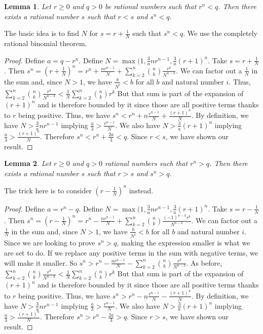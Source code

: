 \documentclass[12pt]{article}
\newtheorem{lemma}{Lemma}
\theoremstyle{remark}
\begin{document}
\begin{lemma}\label{app:lesser}
Let $r \geq 0 $ and $q > 0$ be rational numbers such that $r^n < q$. Then there exists a rational number $s$ such that $r < s$ and $s^n < q$.
\end{lemma}

The basic idea is to find $N$ for $s = r + \tfrac{1}{N}$ such that $s^n < q$. We use the completely rational binomial theorem.  

\begin{proof}
Define $a = q - r^n$. Define $N =  \max(1,\tfrac{3}{a}n r^{n-1}, \tfrac{3}{a}(r+1)^n$.  Take $s = r + \tfrac{1}{N}$. Then $s^n = (r+ \tfrac{1}{N})^n = r^n + \tfrac{n r^{n-1}}{N} + \sum_{k=2}^{n} \binom{n}{k} \tfrac{r^k}{N^{n-k}}$. We can factor out a $\tfrac{1}{N}$ in the sum and, since $N > 1$, we have $\tfrac{b}{N^i} < b$ for all $b$ and natural number $i$. Thus, $\sum_{k=2}^{n} \binom{n}{k} \tfrac{r^k}{N^{n-k}} < \tfrac{1}{N} \sum_{k=2}^{n} \binom{n}{k} r^k$  But that sum is part of the expansion of $(r+1)^n$ and is therefore bounded by it since those are all positive terms thanks to $r$ being positive. Thus, we have $s^n < r^n + n \tfrac{r^{n-1}}{N} + \tfrac{ (r+1)^n }{N}$.  By definition, we have $N > \tfrac{3}{a} n r^{n-1}$ implying $\tfrac{a}{3} > \tfrac{ r^{n-1}}{N}$. We also have $N > \tfrac{3}{a} (r+1)^n$ implying $\tfrac{a}{3} > \tfrac{(r+1)^n}{N}$. Therefore $s^n < r^n + \tfrac{2 a}{3} < q$. Since $r<s$, we have shown our result. 
\end{proof}

\begin{lemma}\label{app:greater}
Let $r \geq 0 $ and $q > 0$ rational numbers such that $r^n > q$. Then there exists a rational number $s$ such that $r > s$ and $s^n > q$.
\end{lemma}

The trick here is to consider $(r-\tfrac{1}{N})^n$ instead. 

\begin{proof}
Define $a = r^n - q$. Define $N =  \max(1,\tfrac{3}{a}n r^{n-1}, \tfrac{3}{a}(r+1)^n$.  Take $s = r - \tfrac{1}{N}$. Then $s^n = (r- \tfrac{1}{N})^n = r^n - \tfrac{n r^{n-1}}{N} + \sum_{k=2}^{n} \binom{n}{k} \tfrac{ (-1)^{n-k} r^k}{N^{n-k}}$. We can factor out a $\tfrac{1}{N}$ in the sum and, since $N > 1$, we have $\tfrac{b}{N^i} < b$ for all $b$ and natural number $i$. Since we are looking to prove $s^n > q$, making the expression smaller is what we are set to do. If we replace any positive terms in the sum with negative terms, we will make it smaller. So $s^n > r^n - \tfrac{n r^{n-1}}{N} - \sum_{k=2}^{n} \binom{n}{k} \tfrac{r^k}{N^{n-k}}$. As before, $\sum_{k=2}^{n} \binom{n}{k} \tfrac{r^k}{N^{n-k}} < \tfrac{1}{N} \sum_{k=2}^{n} \binom{n}{k} r^k$  But that sum is part of the expansion of $(r+1)^n$ and is therefore bounded by it since those are all positive terms thanks to $r$ being positive. Thus, we have $s^n > r^n - n \tfrac{r^{n-1}}{N} - \tfrac{ (r+1)^n }{N}$.  By definition, we have $N > \tfrac{3}{a} n r^{n-1}$ implying $\tfrac{a}{3} > \tfrac{ r^{n-1}}{N}$. We also have $N > \tfrac{3}{a} (r+1)^n$ implying $\tfrac{a}{3} > \tfrac{(r+1)^n}{N}$. Therefore $s^n > r^n - \tfrac{2 a}{3} > q$. Since $r>s$, we have shown our result. 
\end{proof}
\end{document}
